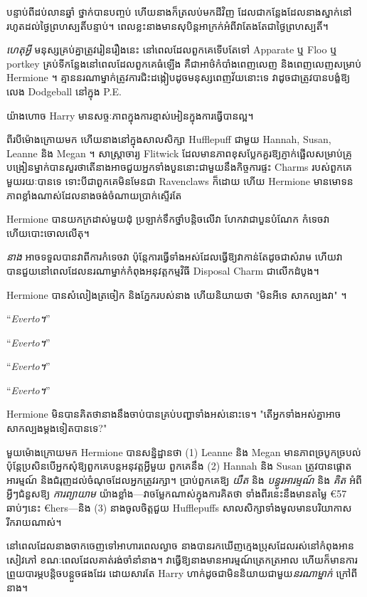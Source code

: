 {បន្ទាប់ពីដប់លានឆ្នាំ ថ្នាក់បានបញ្ចប់ ហើយនាងក៏ត្រលប់មកដីវិញ ដែលជាកន្លែងដែលនាងស្នាក់នៅរហូតដល់ថ្ងៃព្រហស្បតិ៍បន្ទាប់។ ពេលខ្លះនាងមានសុបិន្តអាក្រក់អំពីវាតែងតែជាថ្ងៃព្រហស្បតិ៍។

\emph{ហេតុអ្វី} មនុស្សគ្រប់គ្នាត្រូវរៀនរឿងនេះ នៅពេលដែលពួកគេទើបតែទៅ Apparate ឬ Floo ឬ portkey គ្រប់ទីកន្លែងនៅពេលដែលពួកគេធំឡើង គឺជាអាថ៌កំបាំងពេញលេញ និងពេញលេញសម្រាប់ Hermione ។ គ្មាននរណាម្នាក់ត្រូវការជិះដង្កៀបដូចមនុស្សពេញវ័យនោះទេ វាដូចជាត្រូវបានបង្ខំឱ្យលេង Dodgeball នៅក្នុង P.E.

យ៉ាងហោច Harry មានសច្ចៈភាពក្នុងការខ្មាស់អៀនក្នុងការធ្វើបានល្អ។

\later

ពីរបីម៉ោងក្រោយមក ហើយនាងនៅក្នុងសាលសិក្សា Hufflepuff ជាមួយ Hannah, Susan, Leanne និង Megan ។ សាស្ត្រាចារ្យ Flitwick ដែលមានភាពខុសប្លែកគួរឱ្យភ្ញាក់ផ្អើលសម្រាប់គ្រូបង្រៀនម្នាក់បានសួរថាតើនាងអាចជួយអ្នកទាំងបួននោះជាមួយនឹងកិច្ចការផ្ទះ Charms របស់ពួកគេមួយរយៈបានទេ ទោះបីជាពួកគេមិនមែនជា Ravenclaws ក៏ដោយ ហើយ Hermione មានមោទនភាពខ្លាំងណាស់ដែលនាងចង់ចំណាយប្រាក់ស្ទើរតែ \emph{ }

Hermione បានយកក្រដាស់មួយដុំ ប្រឡាក់ទឹកថ្នាំបន្តិចលើវា ហែកវាជាបួនបំណែក កំទេចវា ហើយបោះចោលលើតុ។

\emph{នាង} អាចទទួលបានវាពីការកំទេចវា ប៉ុន្តែការធ្វើទាំងអស់ដែលធ្វើឱ្យវាកាន់តែដូចជាសំរាម ហើយវាបានជួយនៅពេលដែលនរណាម្នាក់កំពុងអនុវត្តកម្មវិធី Disposal Charm ជាលើកដំបូង។

Hermione បានសំលៀងត្រចៀក និងភ្នែករបស់នាង ហើយនិយាយថា "មិនអីទេ សាកល្បងវា" ។

“\emph{Everto។}”

“\emph{Everto។}”

“\emph{Everto។}”

“\emph{Everto។}”

Hermione មិន​បាន​គិត​ថា​នាង​នឹង​ចាប់​បាន​គ្រប់​បញ្ហា​ទាំង​អស់​នោះ​ទេ។ "តើអ្នកទាំងអស់គ្នាអាចសាកល្បងម្តងទៀតបានទេ?"

មួយម៉ោងក្រោយមក Hermione បានសន្និដ្ឋានថា (1) Leanne និង Megan មានភាពច្របូកច្របល់ ប៉ុន្តែប្រសិនបើអ្នកសុំឱ្យពួកគេបន្តអនុវត្តអ្វីមួយ ពួកគេនឹង (2) Hannah និង Susan ត្រូវបានផ្តោតអារម្មណ៍ និងជំរុញដល់ចំណុចដែលអ្នកត្រូវរក្សា។ ប្រាប់ពួកគេឱ្យ \emph{យឺត} និង \emph{បន្ធូរអារម្មណ៍} និង \emph{គិត} អំពីអ្វីៗជំនួសឱ្យ \emph{ការព្យាយាម} យ៉ាងខ្លាំង—វាចម្លែកណាស់ក្នុងការគិតថា ទាំងពីរនេះនឹងមានតម្លៃ €57 ឆាប់ៗនេះ €{hers}—និង (3) នាងចូលចិត្តជួយ Hufflepuffs សាលសិក្សាទាំងមូលមានបរិយាកាសរីករាយណាស់។

នៅពេលដែលនាងចាកចេញទៅអាហារពេលល្ងាច នាងបានរកឃើញក្មេងប្រុសដែលរស់នៅកំពុងអានសៀវភៅ ខណៈពេលដែលគាត់រង់ចាំនាំនាង។ វាធ្វើឱ្យនាងមានអារម្មណ៍ត្រេកត្រអាល ហើយក៏មានការព្រួយបារម្ភបន្តិចបន្តួចផងដែរ ដោយសារតែ Harry ហាក់ដូចជាមិននិយាយជាមួយ\emph{នរណាម្នាក់} ក្រៅពីនាង។

}
